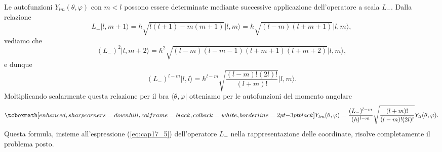 Le autofunzioni $Y_{lm}(\theta , \varphi)$ con $m<l$ possono essere determinate mediante successive applicazione dell'operatore a scala $L_-$. Dalla relazione
	\begin{equation}
		L_-\vert l, m+1 \rangle = \hbar \sqrt{l(l+1) - m(m+1)} \vert l,m \rangle = \hbar \sqrt{(l-m)(l+m+1)} \vert l,m \rangle ,
	\end{equation}
vediamo che 
	\begin{equation}
	(L_-)^2 \vert l, m+2 \rangle = \hbar ^2 \sqrt{(l-m)(l-m-1)(l+m+1)(l+m+2)}\vert l,m \rangle ,
	\end{equation}
e dunque
	\begin{equation}
	(L_-)^{l-m} \vert l, l \rangle = \hbar ^{l-m} \sqrt{\frac{(l-m)!(2l)!}{(l+m)!}}\vert l,m \rangle .
	\end{equation}
Moltiplicando scalarmente questa relazione per il bra $\langle \theta , \varphi \vert $ otteniamo per le autofunzioni del momento angolare
	\begin{equation}
		\tcboxmath[enhanced, sharp corners=downhill, colframe=black, colback=white, borderline={2pt}{-3pt}{black}]{
			Y_{lm} (\theta ,  \varphi ) = \frac{(L_-)^{l-m}}{(\hbar )^{l-m}}\sqrt{\frac{(l+m)!}{(l-m)!(2l)!}} Y_{ll} (\theta , \varphi) . 
		}
	\end{equation}
Questa formula, insieme all'espressione (\ref{eq:cap17_5}) dell'operatore $L_-$ nella rappresentazione delle coordinate, risolve completamente il problema posto.\\

